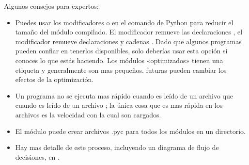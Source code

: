 \documentclass[a4,10pt,spanish]{sphinxmanual}
\begin{document}
\sphinxAtStartPar
Algunos consejos para expertos:
\begin{itemize}
\item {} 
\sphinxAtStartPar
Puedes usar los modificadores  o  en el comando de Python para reducir el tamaño del módulo compilado. El modificador  remueve las declaraciones , el modificador  remueve declaraciones  y cadenas . Dado que algunos programas pueden confiar en tenerlos disponibles, solo deberías usar esta opción si conoces lo que estás haciendo. Los módulos «optimizados» tienen una etiqueta  y generalmente son mas pequeños.  futuras pueden cambiar los efectos de la optimización.

\item {} 
\sphinxAtStartPar
Un programa no se ejecuta mas rápido cuando es leído de un archivo  que cuando es leído de un archivo ; la única cosa que es mas rápida en los archivos  es la velocidad con la cual son cargados.

\item {} 
\sphinxAtStartPar
El módulo  puede crear archivos .pyc para todos los módulos en un directorio.

\item {} 
\sphinxAtStartPar
Hay mas detalle de este proceso, incluyendo un diagrama de flujo de decisiones, en .

\end{itemize}
\end{document}
